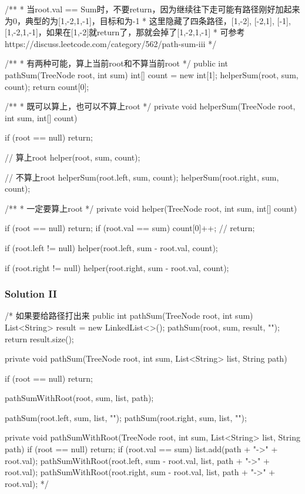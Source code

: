 \begin{Code}
/**
 * 当root.val == Sum时，不要return，因为继续往下走可能有路径刚好加起来为0，典型的为[1,-2,1,-1]，目标和为-1
 * 这里隐藏了四条路径，[1,-2], [-2,1], [-1], [1,-2,1,-1]，如果在[1,-2]就return了，那就会掉了[1,-2,1,-1]
 * 可参考https://discuss.leetcode.com/category/562/path-sum-iii
 */

/**
 * 有两种可能，算上当前root和不算当前root
 */
public int pathSum(TreeNode root, int sum) {
    int[] count = new int[1];
    helperSum(root, sum, count);
    return count[0];
}

/**
 *  既可以算上，也可以不算上root
 */
private void helperSum(TreeNode root, int sum, int[] count) {
    if (root == null) {
        return;
    }

    // 算上root
    helper(root, sum, count);

    // 不算上root
    helperSum(root.left, sum, count);
    helperSum(root.right, sum, count);
}

/**
 * 一定要算上root
 */
private void helper(TreeNode root, int sum, int[] count) {
    if (root == null) {
        return;
    }
    if (root.val == sum) {
        count[0]++;
       // return;
    }

    if (root.left != null) {
        helper(root.left, sum - root.val, count);
    }

    if (root.right != null) {
        helper(root.right, sum - root.val, count);
    }
}
\end{Code}

\newpage

\subsubsection{Solution II}
\begin{Code}
/* 如果要给路径打出来
public int pathSum(TreeNode root, int sum) {
    List<String> result = new LinkedList<>();
    pathSum(root, sum, result, "");
    return result.size();
}

private void pathSum(TreeNode root, int sum, List<String> list, String path) {
    if (root == null) {
        return;
    }

    pathSumWithRoot(root, sum, list, path);

    pathSum(root.left, sum, list, "");
    pathSum(root.right, sum, list, "");
}

private void pathSumWithRoot(TreeNode root, int sum, List<String> list, String path) {
    if (root == null) {
        return;
    }
    if (root.val == sum) {
        list.add(path + "->" + root.val);
    }
    pathSumWithRoot(root.left, sum - root.val, list, path + "->" + root.val);
    pathSumWithRoot(root.right, sum - root.val, list, path + "->" + root.val);
}*/
\end{Code}

